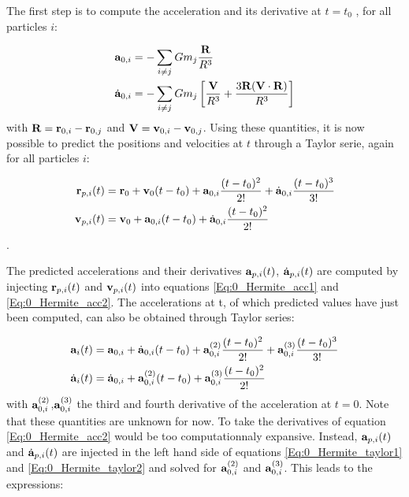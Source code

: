 The first step is to compute the acceleration and its derivative at $t=t_0$ , for all particles $i$:

\begin{align}
\label{Eq:0_Hermite_acc1}
\bold{a}_{0,i} &= - \sum\limits_{i\neq j} G m_j \frac{\bold{R}}{R^3}\\
\label{Eq:0_Hermite_acc2}
\dot{\bold{a}}_{0,i} &=  - \sum\limits_{i\neq j} G m_j \left[ \frac{\bold{V}}{R^3}  + 
	\frac{ 3 \bold{R} ( \bold{V} \cdot \bold{R} )  }{R^3}\right]
\end{align}
with $\bold{R} = \bold{r}_{0,i} - \bold{r}_{0,j} $ and $\bold{V} = \bold{v}_{0,i} - \bold{v}_{0,j} $. Using these quantities, it is now possible to predict the positions and velocities at $t$ through a Taylor serie, again for all particles $i$:

\begin{align}
\bold{r}_{p,i}(t) &= \bold{r}_0 + \bold{v}_0 (t-t_0) + \bold{a}_{0,i}\frac{(t-t_0)^2}{2!} 	
		 +\dot{\bold{a}}_{0,i}\frac{(t-t_0)^3}{3!}\\
\bold{v}_{p,i}(t) &= \bold{v}_0 + \bold{a}_{0,i}(t-t_0) + \dot{\bold{a}}_{0,i}\frac{(t-t_0)^2}{2!}
\end{align}.

The predicted accelerations and their derivatives $\bold{a}_{p,i}(t)$,  $\dot{\bold{a}}_{p,i}(t)$ are computed by injecting $\bold{r}_{p,i}(t)$ and $\bold{v}_{p,i}(t)$ into equations \ref{Eq:0_Hermite_acc1} and \ref{Eq:0_Hermite_acc2}. The accelerations at t, of which predicted values have just been computed, can also be obtained through Taylor series:

\begin{align}
\label{Eq:0_Hermite_taylor1}
\bold{a}_{i}(t) &= \bold{a}_{0,i} + \dot{\bold{a}}_{0,i} (t-t_0) + \bold{a}^{(2)}_{0,i}\frac{(t-t_0)^2}{2!} + \bold{a}^{(3)}_{0,i}\frac{(t-t_0)^3}{3!}\\
\label{Eq:0_Hermite_taylor2}
\dot{\bold{a}}_{i}(t) &=  \dot{\bold{a}}_{0,i} +  \bold{a}^{(2)}_{0,i}(t-t_0) + \bold{a}^{(3)}_{0,i}\frac{(t-t_0)^2}{2!}
\end{align}
with $\bold{a}^{(2)}_{0,i}$,$\bold{a}^{(3)}_{0,i}$ the third and fourth derivative of the acceleration at $t=0$. Note that these quantities are unknown for now. To take the derivatives of equation \ref{Eq:0_Hermite_acc2} would be too computationnaly expansive. Instead, $\bold{a}_{p,i}(t)$ and  $\dot{\bold{a}}_{p,i}(t)$ are injected in the left hand side of equations \ref{Eq:0_Hermite_taylor1} and \ref{Eq:0_Hermite_taylor2} and solved for $\bold{a}^{(2)}_{0,i}$ and $\bold{a}^{(3)}_{0,i}$. This leads to the expressions:

